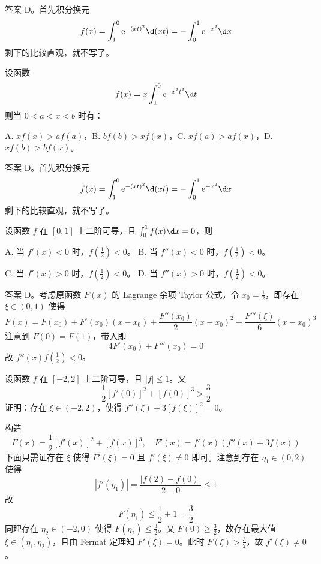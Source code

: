 \begin{solution}
	答案 D。首先积分换元
	\[ f(x) = \int_{1}^{0} \ee^{-(xt)^2} \d (xt) = -\int_{0}^{1} \ee^{-x^2} \d x  \]
	剩下的比较直观，就不写了。
\end{solution}

\begin{problem}[000022]
设函数
\[ f(x) = x \int_{1}^{0} \ee^{-x^2t^2} \d t \]
则当 $0<a<x<b$ 时有：

A. $xf(x) > af(a)$，B. $bf(b) > x f(x)$，C. $xf(a) > af(x)$，D. $xf(b) > bf(x)$。
\end{problem}

\begin{solution}
	答案 D。首先积分换元
	\[ f(x) = \int_{1}^{0} \ee^{-(xt)^2} \d (xt) = -\int_{0}^{1} \ee^{-x^2} \d x  \]
	剩下的比较直观，就不写了。
\end{solution}

\begin{problem}[000023]
设函数 $f$ 在 $[0, 1]$ 上二阶可导，且 $\int_{0}^{1} f(x) \d x = 0$，则

A. 当 $f'(x) < 0$ 时，$f(\frac{1}{2}) < 0$。
B. 当 $f''(x) < 0$ 时，$f(\frac{1}{2}) < 0$。

C. 当 $f'(x) > 0$ 时，$f(\frac{1}{2}) < 0$。
D. 当 $f''(x) > 0$ 时，$f(\frac{1}{2}) < 0$。
\end{problem}

\begin{solution}
	答案 D。考虑原函数 $F(x)$ 的 Lagrange 余项 Taylor 公式，令 $x_0 = \frac{1}{2}$，即存在 $\xi \in (0, 1)$ 使得
	\[ F(x) = F(x_0) + F'(x_0)(x-x_0) + \frac{F''(x_0)}{2}(x-x_0)^2 + \frac{F'''(\xi)}{6}(x-x_0)^3 \]
	注意到 $F(0) = F(1)$，带入即
	\[ 4 F'(x_0) + F'''(x_0) = 0 \]
	故 $f''(x) f(\frac{1}{2}) < 0$。
\end{solution}


\begin{problem}[000024]
设函数 $f$ 在 $[-2, 2]$ 上二阶可导，且 $|f| \leqslant 1$。又
\[ \frac{1}{2}[f'(0)]^2 + [f(0)]^3 > \frac{3}{2} \]
证明：存在 $\xi \in (-2,2)$，使得 $f''(\xi) + 3[f(\xi)]^2 = 0$。
\end{problem}

\begin{solution}
	构造
	\[ F(x) = \frac{1}{2}[f'(x)]^2 + [f(x)]^3,\quad F'(x) = f'(x)(f''(x) + 3f(x)) \]
	下面只需证存在 $\xi$ 使得 $F'(\xi) = 0$ 且 $f'(\xi) \neq 0$ 即可。注意到存在 $\eta_1 \in (0, 2)$ 使得
	\[ |f'(\eta_1)| = \frac{|f(2) - f(0)|}{2 - 0} \leqslant 1 \]
	故
	\[ F(\eta_1) \leqslant \frac{1}{2} + 1 = \frac{3}{2} \]
	同理存在 $\eta_2 \in (-2, 0)$ 使得 $F(\eta_2) \leqslant \frac{3}{2}$。又 $F(0) \geqslant \frac{3}{2}$，故存在最大值 $\xi \in (\eta_1, \eta_2)$，且由 Fermat 定理知 $F'(\xi) = 0$。此时 $F(\xi) > \frac{3}{2}$，故 $f'(\xi) \neq 0$。
\end{solution}


